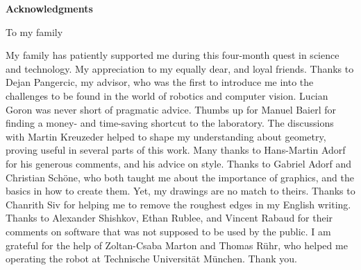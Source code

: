 \clearemptydoublepage
{}
{}	



\vspace*{2cm}

\begin{center}
{\Large \bf Acknowledgments}
\end{center}

\vspace{1cm}

\begin{center}
    To my family
\vspace{1cm}
\end{center}


\vspace{1cm}


My family has patiently supported me during this four-month quest in science and
technology. My appreciation to my equally dear, and loyal friends. Thanks to
Dejan Pangercic, my advisor, who was the first to introduce me into the
challenges to be found in the world of robotics and computer vision. Lucian
Goron was never short of pragmatic advice. Thumbs up for Manuel Baierl for
finding a money- and time-saving shortcut to the laboratory. The discussions
with Martin Kreuzeder helped to shape my understanding about geometry, proving
useful in several parts of this work.  Many thanks to Hans-Martin Adorf for his
generous comments, and his advice on style.  Thanks to Gabriel Adorf and
Christian Schöne, who both taught me about the importance of graphics, and the
basics in how to create them. Yet, my drawings are no match to theirs. Thanks
to Chanrith Siv for helping me to remove the roughest edges in my English
writing.  Thanks to Alexander Shishkov, Ethan Rublee, and Vincent Rabaud for
their comments on software that was not supposed to be used by the public. I am
grateful for the help of Zoltan-Csaba Marton and Thomas Rühr, who helped me
operating the robot at Technische Universität München. Thank you.

